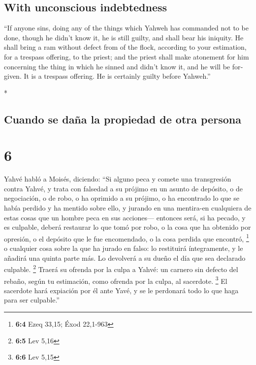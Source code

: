 \begin{paracol}{2}
\begin{otherlanguage}{english}
\hypertarget{with-unconscious-indebtedness}{%
\subsection{With unconscious
indebtedness}\label{with-unconscious-indebtedness}}

 ``If anyone sins, doing any of the things which Yahweh
has commanded not to be done, though he didn't know it, he is still
guilty, and shall bear his iniquity.  He shall bring a
ram without defect from of the flock, according to your estimation, for
a trespass offering, to the priest; and the priest shall make atonement
for him concerning the thing in which he sinned and didn't know it, and
he will be forgiven.  It is a trespass offering. He is
certainly guilty before Yahweh.''

\end{otherlanguage}

\switchcolumn[0]*

\hypertarget{cuando-se-dauxf1a-la-propiedad-de-otra-persona}{%
\subsection{Cuando se daña la propiedad de otra
persona}\label{cuando-se-dauxf1a-la-propiedad-de-otra-persona}}

\hypertarget{section-10}{%
\section{6}\label{section-10}}

 Yahvé habló a Moisés, diciendo:  ``Si
alguno peca y comete una transgresión contra Yahvé, y trata con falsedad
a su prójimo en un asunto de depósito, o de negociación, o de robo, o ha
oprimido a su prójimo,  o ha encontrado lo que se había
perdido y ha mentido sobre ello, y jurando en una mentira-en cualquiera
de estas cosas que un hombre peca en sus acciones--- 
entonces será, si ha pecado, y es culpable, deberá restaurar lo que tomó
por robo, o la cosa que ha obtenido por opresión, o el depósito que le
fue encomendado, o la cosa perdida que encontró, \footnote{\textbf{6:4}
  Ezeq 33,15; Éxod 22,1-963}  o cualquier cosa sobre la
que ha jurado en falso: lo restituirá íntegramente, y le añadirá una
quinta parte más. Lo devolverá a su dueño el día que sea declarado
culpable. \footnote{\textbf{6:5} Lev 5,16}  Traerá su
ofrenda por la culpa a Yahvé: un carnero sin defecto del rebaño, según
tu estimación, como ofrenda por la culpa, al sacerdote. \footnote{\textbf{6:6}
  Lev 5,15}  El sacerdote hará expiación por él ante Yavé,
y se le perdonará todo lo que haga para ser culpable.''


\end{paracol}
